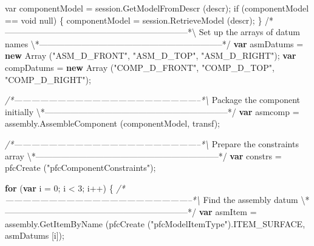 \documentclass[]{article}
\newenvironment{Shaded}{}{}
\newcommand{\KeywordTok}[1]{\textcolor[rgb]{0.00,0.44,0.13}{\textbf{{#1}}}}
\newcommand{\DecValTok}[1]{\textcolor[rgb]{0.25,0.63,0.44}{{#1}}}
\newcommand{\FloatTok}[1]{\textcolor[rgb]{0.25,0.63,0.44}{{#1}}}
\newcommand{\StringTok}[1]{\textcolor[rgb]{0.25,0.44,0.63}{{#1}}}
\newcommand{\CommentTok}[1]{\textcolor[rgb]{0.38,0.63,0.69}{\textit{{#1}}}}
\newcommand{\OtherTok}[1]{\textcolor[rgb]{0.00,0.44,0.13}{{#1}}}
\newcommand{\FunctionTok}[1]{\textcolor[rgb]{0.02,0.16,0.49}{{#1}}}
\newcommand{\NormalTok}[1]{{#1}}
\begin{document}
\begin{Shaded}
\begin{Highlighting}[]
\OtherTok{  var componentModel = session.GetModelFromDescr }\FloatTok{(}\OtherTok{descr}\FloatTok{)}\OtherTok{;}
\OtherTok{  }
\OtherTok{  if }\FloatTok{(}\OtherTok{componentModel == void null}\FloatTok{)}
\OtherTok{    \{}
\OtherTok{      componentModel = session.RetrieveModel }\FloatTok{(}\OtherTok{descr}\FloatTok{)}\OtherTok{;}
\OtherTok{    \}}
\OtherTok{  }
\OtherTok{/}\NormalTok{*-----------------------------------------------------------------*\textbackslash{}}
  \NormalTok{Set up the arrays of datum names}
\NormalTok{\textbackslash{}*-----------------------------------------------------------------*}\OtherTok{/}
  \KeywordTok{var} \NormalTok{asmDatums = }\KeywordTok{new} \FunctionTok{Array} \NormalTok{(}\StringTok{"ASM_D_FRONT"}\NormalTok{, }\StringTok{"ASM_D_TOP"}\NormalTok{, }\StringTok{"ASM_D_RIGHT"}\NormalTok{);}
  \KeywordTok{var} \NormalTok{compDatums = }\KeywordTok{new} \FunctionTok{Array} \NormalTok{(}\StringTok{"COMP_D_FRONT"}\NormalTok{, }
                  \StringTok{"COMP_D_TOP"}\NormalTok{, }
                  \StringTok{"COMP_D_RIGHT"}\NormalTok{);}
      
\CommentTok{/*-----------------------------------------------------------------*\textbackslash{}}
  \NormalTok{Package the component initially}
\NormalTok{\textbackslash{}*-----------------------------------------------------------------*}\OtherTok{/}
  \KeywordTok{var} \NormalTok{asmcomp = }\OtherTok{assembly}\NormalTok{.}\FunctionTok{AssembleComponent} \NormalTok{(componentModel,}
                        \NormalTok{transf);}
  
\CommentTok{/*-----------------------------------------------------------------*\textbackslash{}}
  \NormalTok{Prepare the constraints array}
\NormalTok{\textbackslash{}*-----------------------------------------------------------------*}\OtherTok{/}
  \KeywordTok{var} \NormalTok{constrs = }\FunctionTok{pfcCreate} \NormalTok{(}\StringTok{"pfcComponentConstraints"}\NormalTok{);}
  
  \KeywordTok{for} \NormalTok{(}\KeywordTok{var} \NormalTok{i = }\DecValTok{0}\NormalTok{; i < }\DecValTok{3}\NormalTok{; i++)}
    \NormalTok{\{}
\CommentTok{/*-----------------------------------------------------------------*\textbackslash{}}
  \NormalTok{Find the assembly datum }
\NormalTok{\textbackslash{}*-----------------------------------------------------------------*}\OtherTok{/}
      \KeywordTok{var} \NormalTok{asmItem = }
    \OtherTok{assembly}\NormalTok{.}\FunctionTok{GetItemByName} \NormalTok{(}\FunctionTok{pfcCreate} \NormalTok{(}\StringTok{"pfcModelItemType"}\NormalTok{).}\FunctionTok{ITEM_SURFACE}\NormalTok{, }
                \NormalTok{asmDatums [i]);}
      

\end{Highlighting}
\end{Shaded}
\end{document}

